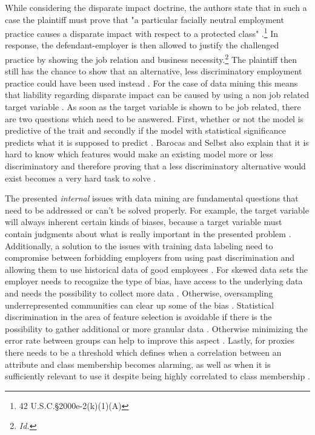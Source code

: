 While considering the disparate impact doctrine, the authors state that in such a case 
the plaintiff must prove that "a particular facially neutral employment practice causes 
a disparate impact with respect to a protected class" \cite{Barocas.2016, titleVII}.\footnote{ 42 U.S.C.§2000e-2(k)(1)(A) } In response, the defendant-employer 
is then allowed to justify the challenged practice by showing the job relation and 
business necessity.\footnote{ \textit{Id.} } The plaintiff then still has the chance 
to show that an alternative, less discriminatory employment practice could have been 
used instead \cite{Barocas.2016}. For the case of data mining this means that liability 
regarding disparate impact can be caused by using a non job related target variable 
\cite{Barocas.2016}. As soon as the target variable is shown to be job related, there 
are two questions which need to be answered. First, whether or not the model is 
predictive of the trait and secondly if the model with statistical significance 
predicts what it is supposed to predict \cite{Barocas.2016}. Barocas and Selbst 
also explain that it is hard to know which features would make an existing model more
or less discriminatory and therefore proving that a less discriminatory alternative 
would exist becomes a very hard task to solve \cite{Barocas.2016}.

The presented \textit{internal} issues with data mining are fundamental questions that need to be addressed or can't be solved properly. For example, the target variable will always inherent certain kinds of biases, because a target variable must contain judgments about what is really important in the presented problem \cite{Barocas.2016}. Additionally, a solution to the issues with training data labeling need to compromise between forbidding employers from using past discrimination and allowing them to use historical data of good employees \cite{Barocas.2016}. For skewed data sets the employer needs to recognize the type of bias, have access to the underlying data and needs the possibility to collect more data  \cite{Barocas.2016}. Otherwise, oversampling underrepresented communities can clear up some of the bias \cite{Barocas.2016}. Statistical discrimination in the area of feature selection is avoidable if there is the possibility to gather additional or more granular data \cite{Barocas.2016}. Otherwise minimizing the error rate between groups can help to improve this aspect \cite{Barocas.2016}. Lastly, for proxies there needs to be a threshold which defines when a correlation between an attribute and class membership becomes alarming, as well as when it is sufficiently relevant to use it despite being highly correlated to class membership \cite{Barocas.2016}.

